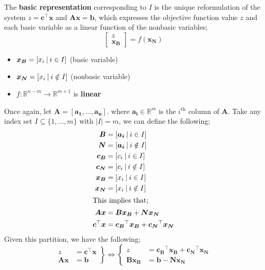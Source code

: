 \documentclass[a4paper, 12pt]{article}
\newcommand{\mat}[1]{\boldsymbol{#1}}
\renewcommand{\vec}[1]{\boldsymbol{#1}}
\begin{document}
                The \textbf{basic representation} corresponding to $I$ is the unique reformulation of the system $z = \vec{c}^\top\vec{x}$ and $\mat{A}\vec{x} = \vec{b}$, which expresses the objective function value $z$ and each basic variable as a linear function of the nonbasic variables;
                $$\begin{bmatrix}
                    z \\ \vec{x_B}
                \end{bmatrix} = f(\vec{x_N})$$
                \begin{itemize}
                    \itemsep0em
                    \item $\vec{x_B} = [x_i\ \vline\ i \in I]$ (basic variable)
                    \item $\vec{x_N} = [x_i\ \vline\ i \notin I]$ (nonbasic variable)
                    \item $f : \mathbb{R}^{n - m} \to \mathbb{R}^{m + 1}$ is \textbf{linear}
                \end{itemize}
                Once again, let $\mat{A} = [\vec{a_1}, \dots, \vec{a_n}]$. where $\vec{a_i} \in \mathbb{R}^m$ is the $i^\text{th}$ column of $\mat{A}$.
                Take any index set $I \subseteq \{1, \dots, m\}$ with $|I| = m$, we can define the following;
                \begin{align*}
                    \mat{B} & = [\vec{a_i}\ \vline\ i \in I] \\
                    \mat{N} & = [\vec{a_i}\ \vline\ i \notin I] \\
                    \vec{c_B} & = [c_i\ \vline\ i \in I] \\
                    \vec{c_N} & = [c_i\ \vline\ i \notin I] \\
                    \vec{x_B} & = [x_i\ \vline\ i \in I] \\
                    \vec{x_N} & = [x_i\ \vline\ i \notin I] \\
                    \intertext{This implies that;}
                    \mat{A}\vec{x} & = \mat{B}\vec{x_B} + \mat{N}\vec{x_N} \\
                    \vec{c}^\top\vec{x} & = \vec{c_B}^\top\vec{x_B} + \vec{c_N}^\top\vec{x_N}
                \end{align*}
                Given this partition, we have the following;
                $$\left.\begin{aligned}
                    z & = \vec{c}^\top\vec{x} \\
                    \mat{A}\vec{x} & = \vec{b}
                \end{aligned}\right\rbrace \Leftrightarrow \left\lbrace\begin{aligned}
                    z & = \vec{c_B}^\top\vec{x_B} + \vec{c_N}^\top\vec{x_N} \\
                    \mat{B}\vec{x_B} & = \vec{b} - \mat{N}\vec{x_N}
                \end{aligned}\right.$$
\end{document}
